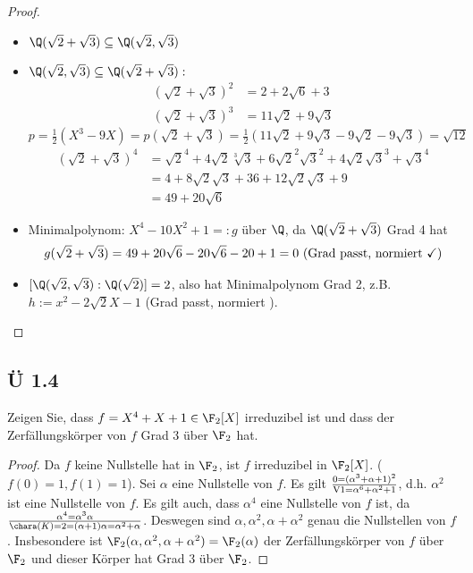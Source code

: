 \begin{proof}
	\begin{itemize}
		\item $\Q(\sqrt{2}+\sqrt{3}) \subseteq \Q(\sqrt{2},\sqrt{3})$
		\item $\Q(\sqrt{2}, \sqrt{3}) \subseteq \Q(\sqrt{2} + \sqrt{3}):$
		\begin{align*}
			(\sqrt{2}+\sqrt{3})^2 &= 2 + 2\sqrt{6} +3\\
			(\sqrt{2} + \sqrt{3})^3 &= 11\sqrt{2} + 9 \sqrt{3}
		\end{align*}
		$p = \frac{1}{2}(X^3 - 9X) = p(\sqrt{2}+\sqrt{3}) = \frac{1}{2}(11\sqrt{2} + 9\sqrt{3}-9\sqrt{2}-9\sqrt{3}) = \sqrt{12}$
		\begin{align*}
			(\sqrt{2}+\sqrt{3})^4 &= \sqrt{2}^4 + 4\sqrt{2}\sqrt[3]{3} + 6\sqrt{2}^2\sqrt{3}^2 + 4\sqrt{2}\sqrt{3}^3 + \sqrt{3}^4\\
			&= 4 + 8 \sqrt{2}\sqrt{3} + 36 + 12\sqrt{2}\sqrt{3}+9\\
			&=49 + 20\sqrt{6}
		\end{align*}
		\item Minimalpolynom: $X^4 -10 X^2 + 1 =: g$ über $\Q$, da $\Q(\sqrt{2}+\sqrt{3})$ Grad 4 hat
		\begin{align*}
			g(\sqrt{2}+\sqrt{3}) = 49 + 20\sqrt{6}-20 \sqrt{6} - 20 +1 =0 \text{ (Grad passt, normiert \checkmark)}
		\end{align*}
		\item $[\Q(\sqrt{2},\sqrt{3}):\Q(\sqrt{2})] = 2$, also hat Minimalpolynom Grad 2, z.B. $h:= x^2 - 2\sqrt{2}X-1$ (Grad passt, normiert \checkmark).
	\end{itemize}
\end{proof}

\subsection{Ü 1.4}
Zeigen Sie, dass $f = X^4 + X +1 \in \F_2 [X]$ irreduzibel ist und dass der Zerfällungskörper von $f$ Grad 3 über $\F_2$ hat.

\begin{proof}
	Da $f$ keine Nullstelle hat in $\F_2$, ist $f$ irreduzibel in $\F_2[X]$. ($f(0) = 1, f(1) = 1$). Sei $\alpha$ eine Nullstelle von $f$. Es gilt $0 = (\alpha^3 + \alpha +1)^2 \over{\text{V1}}{=} \alpha^6 + \alpha^2 +1$, d.h. $\alpha^2$ ist eine Nullstelle von $f$. Es gilt auch, dass $\alpha^4$ eine Nullstelle von $f$ ist, da
	$\alpha^4 = \alpha^3 \alpha \over{\chara(K) =2}{=} (\alpha+1)\alpha = \alpha^2 +\alpha$. Deswegen sind $\alpha, \alpha^2, \alpha + \alpha^2$ genau die Nullstellen von $f$. Insbesondere ist $\F_2 (\alpha, \alpha^2, \alpha + \alpha^2) = \F_2 (\alpha)$ der Zerfällungskörper von $f$ über $\F_2$ und dieser Körper hat Grad 3 über $\F_2$.
\end{proof}

